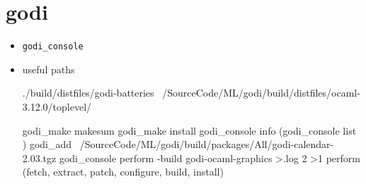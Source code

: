 
\section{godi}
\label{sec:godi}
\begin{itemize}
\item \verb|godi_console |

  \item useful paths \\
    

\begin{bluecode}
./build/distfiles/godi-batteries
~/SourceCode/ML/godi/build/distfiles/ocaml-3.12.0/toplevel/
\end{bluecode}





\begin{bluecode}
godi_make makesum
godi_make  install
godi_console info (godi_console list )
godi_add ~/SourceCode/ML/godi/build/packages/All/godi-calendar-2.03.tgz
godi_console perform -build godi-ocaml-graphics  >.log 2 >1
perform (fetch, extract, patch, configure, build, install)
\end{bluecode}

  
\end{itemize}

